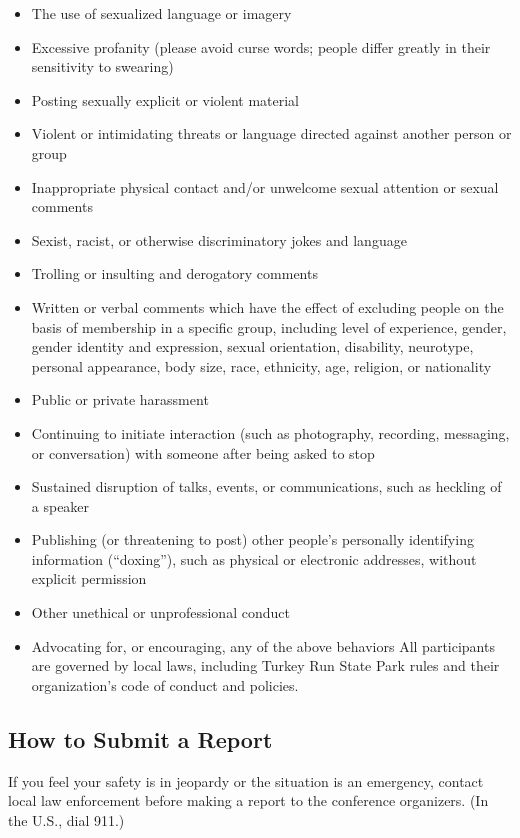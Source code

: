 \begin{itemize}
	\item The use of sexualized language or imagery
	\item Excessive profanity (please avoid curse words; people differ greatly in their sensitivity to swearing)
	\item Posting sexually explicit or violent material
	\item Violent or intimidating threats or language directed against another person or group
	\item Inappropriate physical contact and/or unwelcome sexual attention or sexual comments
	\item Sexist, racist, or otherwise discriminatory jokes and language
	\item Trolling or insulting and derogatory comments
	\item Written or verbal comments which have the effect of excluding people on the basis of membership in a specific group, including level of experience, gender, gender identity and expression, sexual orientation, disability, neurotype, personal appearance, body size, race, ethnicity, age, religion, or nationality
	\item Public or private harassment
	\item Continuing to initiate interaction (such as photography, recording, messaging, or conversation) with someone after being asked to stop
	\item Sustained disruption of talks, events, or communications, such as heckling of a speaker
	\item Publishing (or threatening to post) other people’s personally identifying information (“doxing”), such as physical or electronic addresses, without explicit permission
	\item Other unethical or unprofessional conduct
	\item Advocating for, or encouraging, any of the above behaviors All participants are governed by local laws, including Turkey Run State Park rules and their organization’s code of conduct and policies.
\end{itemize}



\subsection{How to Submit a Report}
If you feel your safety is in jeopardy or the situation is an emergency, contact local law enforcement before making a report to the conference organizers. (In the U.S., dial 911.)

